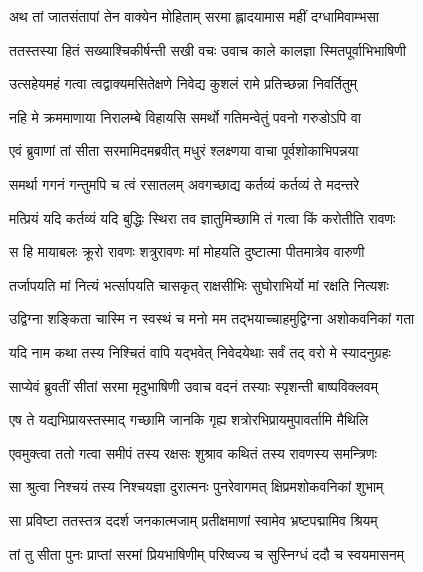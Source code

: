 
\twolineshloka
{अथ तां जातसंतापां तेन वाक्येन मोहिताम्}
{सरमा ह्लादयामास महीं दग्धामिवाम्भसा} %

\twolineshloka
{ततस्तस्या हितं सख्याश्चिकीर्षन्ती सखी वचः}
{उवाच काले कालज्ञा स्मितपूर्वाभिभाषिणी} %

\twolineshloka
{उत्सहेयमहं गत्वा त्वद्वाक्यमसितेक्षणे}
{निवेद्य कुशलं रामे प्रतिच्छन्ना निवर्तितुम्} %

\twolineshloka
{नहि मे क्रममाणाया निरालम्बे विहायसि}
{समर्थो गतिमन्वेतुं पवनो गरुडोऽपि वा} %

\twolineshloka
{एवं ब्रुवाणां तां सीता सरमामिदमब्रवीत्}
{मधुरं श्लक्ष्णया वाचा पूर्वशोकाभिपन्नया} %

\twolineshloka
{समर्था गगनं गन्तुमपि च त्वं रसातलम्}
{अवगच्छाद्य कर्तव्यं कर्तव्यं ते मदन्तरे} %

\twolineshloka
{मत्प्रियं यदि कर्तव्यं यदि बुद्धिः स्थिरा तव}
{ज्ञातुमिच्छामि तं गत्वा किं करोतीति रावणः} %

\twolineshloka
{स हि मायाबलः क्रूरो रावणः शत्रुरावणः}
{मां मोहयति दुष्टात्मा पीतमात्रेव वारुणी} %

\twolineshloka
{तर्जापयति मां नित्यं भर्त्सापयति चासकृत्}
{राक्षसीभिः सुघोराभिर्यो मां रक्षति नित्यशः} %

\twolineshloka
{उद्विग्ना शङ्किता चास्मि न स्वस्थं च मनो मम}
{तद्भयाच्चाहमुद्विग्ना अशोकवनिकां गता} %

\twolineshloka
{यदि नाम कथा तस्य निश्चितं वापि यद्भवेत्}
{निवेदयेथाः सर्वं तद् वरो मे स्यादनुग्रहः} %

\twolineshloka
{साप्येवं ब्रुवतीं सीतां सरमा मृदुभाषिणी}
{उवाच वदनं तस्याः स्पृशन्ती बाष्पविक्लवम्} %

\twolineshloka
{एष ते यद्यभिप्रायस्तस्माद् गच्छामि जानकि}
{गृह्य शत्रोरभिप्रायमुपावर्तामि मैथिलि} %

\twolineshloka
{एवमुक्त्वा ततो गत्वा समीपं तस्य रक्षसः}
{शुश्राव कथितं तस्य रावणस्य समन्त्रिणः} %

\twolineshloka
{सा श्रुत्वा निश्चयं तस्य निश्चयज्ञा दुरात्मनः}
{पुनरेवागमत् क्षिप्रमशोकवनिकां शुभाम्} %

\twolineshloka
{सा प्रविष्टा ततस्तत्र ददर्श जनकात्मजाम्}
{प्रतीक्षमाणां स्वामेव भ्रष्टपद्मामिव श्रियम्} %

\twolineshloka
{तां तु सीता पुनः प्राप्तां सरमां प्रियभाषिणीम्}
{परिष्वज्य च सुस्निग्धं ददौ च स्वयमासनम्} %

